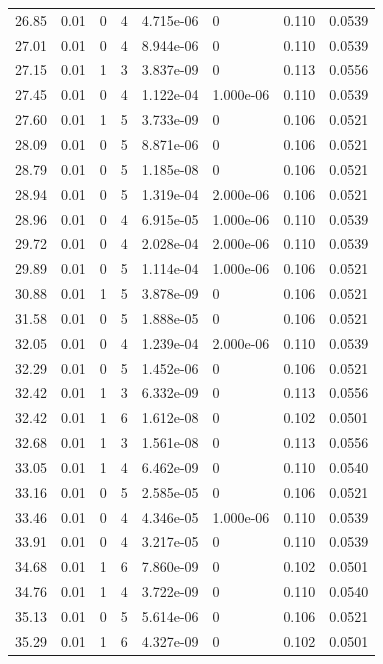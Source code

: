 \documentclass[preview]{standalone}
\begin{document}
{{{\begin{tabular}{L{1.2cm}C{1.2cm} C{0.3cm}C{0.5cm} C{1.4cm}C{1.4cm} C{1.4cm}C{1.4cm}}
  26.85  &  0.01  & 0     &  4 &  4.715e-06  & 0  & 0.110 &  0.0539   \\ 
  27.01  &  0.01  & 0     &  4 &  8.944e-06  & 0  & 0.110 &  0.0539   \\ 
  27.15  &  0.01  & 1     &  3 &  3.837e-09  & 0  & 0.113 &  0.0556   \\ 
  27.45  &  0.01  & 0     &  4 &  1.122e-04  & 1.000e-06  & 0.110 &  0.0539   \\ 
  27.60  &  0.01  & 1     &  5 &  3.733e-09  & 0  & 0.106 &  0.0521   \\ 
  28.09  &  0.01  & 0     &  5 &  8.871e-06  & 0  & 0.106 &  0.0521   \\ 
  28.79  &  0.01  & 0     &  5 &  1.185e-08  & 0  & 0.106 &  0.0521   \\ 
  28.94  &  0.01  & 0     &  5 &  1.319e-04  & 2.000e-06  & 0.106 &  0.0521   \\ 
  28.96  &  0.01  & 0     &  4 &  6.915e-05  & 1.000e-06  & 0.110 &  0.0539   \\ 
  29.72  &  0.01  & 0     &  4 &  2.028e-04  & 2.000e-06  & 0.110 &  0.0539   \\ 
  29.89  &  0.01  & 0     &  5 &  1.114e-04  & 1.000e-06  & 0.106 &  0.0521   \\ 
  30.88  &  0.01  & 1     &  5 &  3.878e-09  & 0  & 0.106 &  0.0521   \\ 
  31.58  &  0.01  & 0     &  5 &  1.888e-05  & 0  & 0.106 &  0.0521   \\ 
  32.05  &  0.01  & 0     &  4 &  1.239e-04  & 2.000e-06  & 0.110 &  0.0539   \\ 
  32.29  &  0.01  & 0     &  5 &  1.452e-06  & 0  & 0.106 &  0.0521   \\ 
  32.42  &  0.01  & 1     &  3 &  6.332e-09  & 0  & 0.113 &  0.0556   \\ 
  32.42  &  0.01  & 1     &  6 &  1.612e-08  & 0  & 0.102 &  0.0501   \\ 
  32.68  &  0.01  & 1     &  3 &  1.561e-08  & 0  & 0.113 &  0.0556   \\ 
  33.05  &  0.01  & 1     &  4 &  6.462e-09  & 0  & 0.110 &  0.0540   \\ 
  33.16  &  0.01  & 0     &  5 &  2.585e-05  & 0  & 0.106 &  0.0521   \\ 
  33.46  &  0.01  & 0     &  4 &  4.346e-05  & 1.000e-06  & 0.110 &  0.0539   \\ 
  33.91  &  0.01  & 0     &  4 &  3.217e-05  & 0  & 0.110 &  0.0539   \\ 
  34.68  &  0.01  & 1     &  6 &  7.860e-09  & 0  & 0.102 &  0.0501   \\ 
  34.76  &  0.01  & 1     &  4 &  3.722e-09  & 0  & 0.110 &  0.0540   \\ 
  35.13  &  0.01  & 0     &  5 &  5.614e-06  & 0  & 0.106 &  0.0521   \\ 
  35.29  &  0.01  & 1     &  6 &  4.327e-09  & 0  & 0.102 &  0.0501   \\ 
\hline 
\end{tabular} 

}}}
\end{document}
